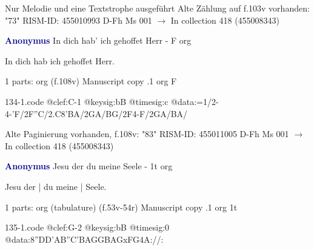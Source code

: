 \documentclass[twocolumn]{book}
\begin{document}
\newline Nur Melodie und eine Textstrophe ausgeführt
\newline Alte Zählung auf f.103v vorhanden: "73"
\newline RISM-ID: 455010993
\newline D-Fh  Ms 001
\newline $\rightarrow$ In collection 418 (455008343)
      
\newline \par \vspace{7pt} \textcolor{darkblue}{\textbf{Anonymus  }}
\newline In dich hab' ich gehoffet Herr - F
\newline org
\newline \begin{itshape}[f.108v, heading:] In dich hab ich gehoffet Herr.\end{itshape} 
\newline \textcolor{darkblue}{}  1 parts: org  (f.108v)
\newline Manuscript copy
.1  org  F  
\begin{filecontents*}{134-1.code}
@clef:C-1
@keysig:bB
@timesig:c
@data:=1/2-4-'F/2F''C/2.C{8'BA}/2GA/BG/2F4-F/2GA/BA/
\end{filecontents*}
\newline
%

\newline Alte Paginierung vorhanden, f.108v: "83"
\newline RISM-ID: 455011005
\newline D-Fh  Ms 001
\newline $\rightarrow$ In collection 418 (455008343)
      
\newline \par \vspace{7pt} \textcolor{darkblue}{\textbf{Anonymus  }}
\newline Jesu der du meine Seele - 1t
\newline org
\newline \begin{itshape}[f.53v, at left:] Jesu der | du meine | Seele.\end{itshape} 
\newline \textcolor{darkblue}{}  1 parts: org (tabulature)  (f.53v-54r)
\newline Manuscript copy
.1  org  1t  
\begin{filecontents*}{135-1.code}
@clef:G-2
@keysig:bB
@timesig:0
@data:{8''DD'AB}{''C'BAG}{GBAG}{xFG}4A://:
\end{filecontents*}
\newline
%
\end{document}
